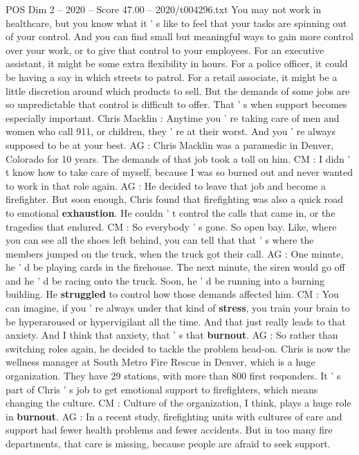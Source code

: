 \begin{textsample}{POS Dim 2 – 2020 – Score 47.00 – 2020/t004296.txt}
You may not work in healthcare, but you know what it ' s like to feel that your tasks are spinning out of your control.
And you can find small but meaningful ways to gain more control over your work, or to give that control to your employees.
For an executive assistant, it might be some extra flexibility in hours.
For a police officer, it could be having a say in which streets to patrol.
For a retail associate, it might be a little discretion around which products to sell.
But the demands of some jobs are so unpredictable that control is difficult to offer.
That ' s when support becomes especially important.
Chris Macklin : Anytime you ' re taking care of men and women who call 911, or children, they ' re at their worst.
And you ' re always supposed to be at your best.
AG : Chris Macklin was a paramedic in Denver, Colorado for 10 years.
The demands of that job took a toll on him.
CM : I didn ' t know how to take care of myself, because I was so burned out and never wanted to work in that role again.
AG : He decided to leave that job and become a firefighter.
But soon enough, Chris found that firefighting was also a quick road to emotional \textbf{exhaustion}.
He couldn ' t control the calls that came in, or the tragedies that endured.
CM : So everybody ' s gone.
So open bay.
Like, where you can see all the shoes left behind, you can tell that that ' s where the members jumped on the truck, when the truck got their call.
AG : One minute, he ' d be playing cards in the firehouse.
The next minute, the siren would go off and he ' d be racing onto the truck.
Soon, he ' d be running into a burning building.
He \textbf{struggled} to control how those demands affected him.
CM : You can imagine, if you ' re always under that kind of \textbf{stress}, you train your brain to be hyperaroused or hypervigilant all the time.
And that just really leads to that anxiety.
And I think that anxiety, that ' s that \textbf{burnout}.
AG : So rather than switching roles again, he decided to tackle the problem head-on.
Chris is now the wellness manager at South Metro Fire Rescue in Denver, which is a huge organization.
They have 29 stations, with more than 800 first responders.
It ' s part of Chris ' s job to get emotional support to firefighters, which means changing the culture.
CM : Culture of the organization, I think, plays a huge role in \textbf{burnout}.
AG : In a recent study, firefighting units with cultures of care and support had fewer health problems and fewer accidents.
But in too many fire departments, that care is missing, because people are afraid to seek support.

\end{textsample}
